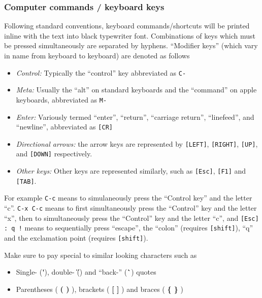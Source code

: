 \documentclass[10pt,letterpaper]{article}
\begin{document}
\subsubsection*{Computer commands / keyboard keys}

Following standard conventions, keyboard commands/shortcuts will be printed inline with the text into black typewriter font.  Combinations of keys which must be pressed simultaneously are separated by hyphens.  ``Modifier keys'' (which vary in name from keyboard to keyboard) are denoted as follows


\begin{itemize}
  \item \emph{Control:} Typically the ``control'' key abbreviated as \texttt{C-}
  \item \emph{Meta:} Usually the ``alt'' on standard keyboards and the ``command'' on apple keyboards, abbreviated as \texttt{M-}
  \item \emph{Enter:} Variously termed ``enter'', ``return'', ``carriage return'', ``linefeed'', and ``newline'', abbreviated as \texttt{[CR]}
  \item \emph{Directional arrows:} the arrow keys are represented by \texttt{[LEFT]}, \texttt{[RIGHT]}, \texttt{[UP]}, and \texttt{[DOWN]} respectively.
  \item \emph{Other keys:} Other keys are represented similarly, such as \texttt{[Esc]}, \texttt{[F1]} and \texttt{[TAB]}.
\end{itemize}


For example \texttt{C-c} means to simulaneously press the ``Control key'' and the letter ``c''.  \texttt{C-x C-c} means to first simultaneously press the ``Control'' key and the letter ``x'', then to simultaneously press the ``Control'' key and the letter ``c'', and \texttt{[Esc] : q !} means to sequentially press ``escape'', the ``colon'' (requires \texttt{[shift]}), ``q'' and the exclamation point (requires \texttt{[shift]}).


Make sure to pay special to similar looking characters such as
\begin{itemize}
  \item Single- (\textcolor{simpleRed}{\textbf{\'}}), double- (\textcolor{simpleRed}{\textbf{\"}}) and ``back-'' (\textcolor{simpleRed}{\textbf{\`}}) quotes
  \item Parentheses (\textcolor{simpleRed}{\textbf{ ( ) }}), brackets (\textcolor{simpleRed}{\textbf{ [ ] }}) and braces (\textcolor{simpleRed}{\textbf{ \{ \} }})
\end{itemize}
\end{document}
